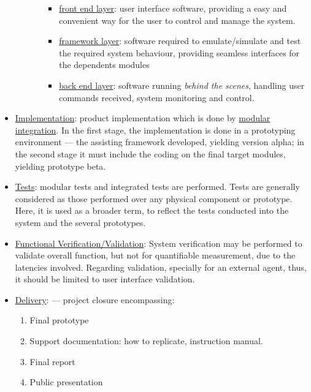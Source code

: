 \begin{itemize}
\begin{itemize}
\begin{itemize}
\begin{itemize}
  \item \uline{front end layer}: user interface software, providing a easy and convenient
    way for the user to control and manage the system.
  \item \uline{framework layer}: software required to emulate/simulate and test the
    required system behaviour, providing seamless interfaces for the dependents
    modules
  \item \uline{back end layer}: software running \emph{behind the scenes}, handling user
    commands received, system monitoring and control.
  \end{itemize}
\end{itemize}
\end{itemize}
\item \uline{Implementation}: product implementation which is done by
  \uline{modular integration}. In the first stage, the implementation is done in a prototyping
environment --- the assisting framework developed, yielding version alpha; in the second stage
it must include the coding on the final target modules, yielding
prototype beta.
\item \uline{Tests}: modular tests and integrated tests are performed. Tests are generally considered as those performed over any physical
component or prototype. Here, it is used as a broader term, to reflect the tests
conducted into the system and the several prototypes.
\item \uline{Functional Verification/Validation}: System verification may be performed to validate overall
  function, but not for quantifiable measurement, due to the latencies
  involved. Regarding validation, specially for an external agent, thus, it should be limited
  to user interface validation.
\item \uline{Delivery}: --- project closure encompassing:
\begin{enumerate}
\item Final prototype
\item Support documentation: how to replicate, instruction manual.
\item Final report
\item Public presentation
\end{enumerate}
\end{itemize}
%
